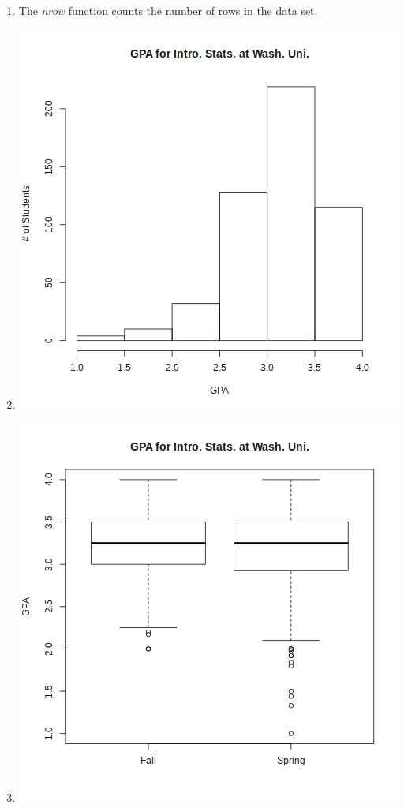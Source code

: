 \documentclass[12pt,letterpaper]{article}
\begin{document}
\begin{enumerate}[label=(\alph*)]
    \item
      The \textit{nrow} function counts the number of rows in the data set.


    \item


      \includegraphics{R_hw1/e.png}

    \item


      \includegraphics{R_hw1/f.png}


\end{enumerate}
\end{document}
